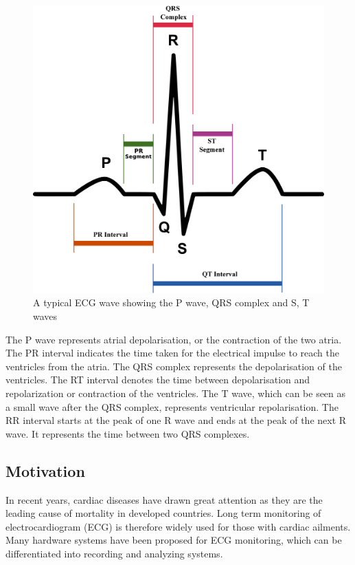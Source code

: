 \documentclass[11pt]{article}
\theoremstyle{definition}
\begin{document}
  \begin{figure}[h]
    \centering
    \includegraphics[scale=0.2]{images/SinusRhythmLabels.jpg}
    \caption{A typical ECG wave showing the P wave, QRS complex and S, T waves\cite{wiki:SinusRythmLabels}}
    \label{fig:pqrst}
  \end{figure}

  The P wave represents atrial depolarisation, or the contraction of the two atria.
  The PR interval indicates the time taken for the electrical impulse to reach the ventricles from the atria.
  The QRS complex represents the depolarisation of the ventricles.
  The RT interval denotes the time between depolarisation and repolarization or contraction of the ventricles.
  The T wave, which can be seen as a small wave after the QRS complex, represents ventricular repolarisation.
  The RR interval starts at the peak of one R wave and ends at the peak of the next R wave. It represents the time between two QRS complexes.

  \subsection{Motivation}
  In recent years, cardiac diseases have drawn great attention as they are the leading cause of mortality in developed countries.
  Long term monitoring of electrocardiogram (ECG) is therefore widely used for those with cardiac ailments.
  Many hardware systems have been proposed for ECG monitoring, which can be differentiated into recording and analyzing systems.
\end{document}
